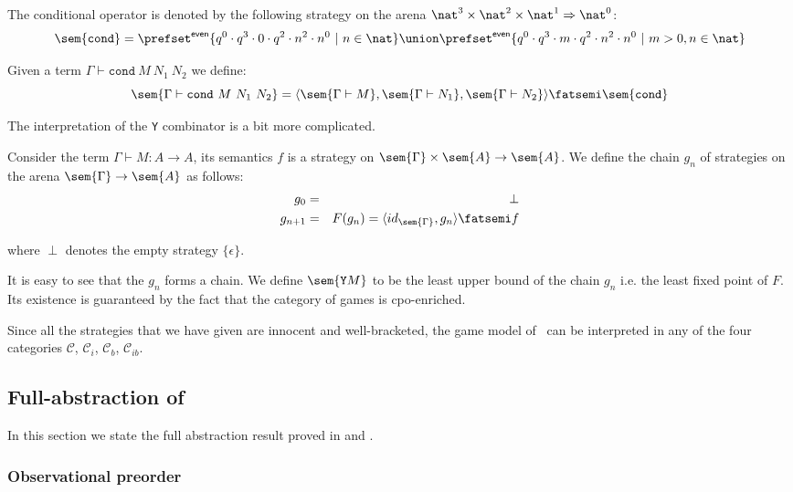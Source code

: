 The conditional operator is denoted by the following strategy on the
arena $\nat^3 \times \nat^2 \times \nat ^1 \Rightarrow \nat^0$:
$$\sem{\texttt{cond}} = \prefset^{\sf even}
    \{ q^0 \cdot q^3 \cdot 0 \cdot q^2 \cdot n^2 \cdot n^0 \ | \ n \in \nat \}
    \union
    \prefset^{\sf even}  \{ q^0 \cdot q^3 \cdot m \cdot q^2 \cdot n^2 \cdot n^0 \ | \ m >0, n \in \nat \}
    $$


Given a term $\Gamma \vdash \texttt{cond}\ M\ N_1\ N_2$ we define:
$$\sem{\Gamma \vdash \texttt{cond}\ M\ N_1\ N_2} =
\langle \sem{\Gamma \vdash M}, \sem{\Gamma \vdash N_1}, \sem{\Gamma
\vdash N_2} \rangle \fatsemi \sem{\texttt{cond}}$$


The interpretation of the \texttt{Y} combinator is a bit more
complicated.

Consider the term $\Gamma \vdash M : A \rightarrow A$, its semantics
$f$ is a strategy on $\sem{\Gamma} \times \sem{A} \rightarrow
\sem{A}$. We define the chain $g_n$ of strategies on the arena
$\sem{\Gamma} \rightarrow \sem{A}$ as follows:
\begin{eqnarray*}
g_0 &=& \perp \\
g_{n+1} &=&  F(g_n) = \langle id_{\sem{\Gamma}}, g_n\rangle \fatsemi f
\end{eqnarray*}

where $\perp$ denotes the empty strategy $\{ \epsilon \}$.

It is easy to see that the $g_n$ forms a chain. We define
$\sem{\texttt{Y} M}$ to be the least upper bound of the chain $g_n$
i.e. the  least fixed point of $F$. Its existence is guaranteed by
the fact that the category of games is cpo-enriched.

Since all the strategies that we have given are innocent and
well-bracketed, the game model of \pcf\ can be interpreted in any of
the four categories $\mathcal{C}$, $\mathcal{C}_i$, $\mathcal{C}_b$,
$\mathcal{C}_{ib}$.



\subsection{Full-abstraction of \pcf}
In this section we state the full abstraction result proved in
\cite{abramsky94full} and \cite{hylandong_pcf}.


\subsubsection{Observational preorder}

